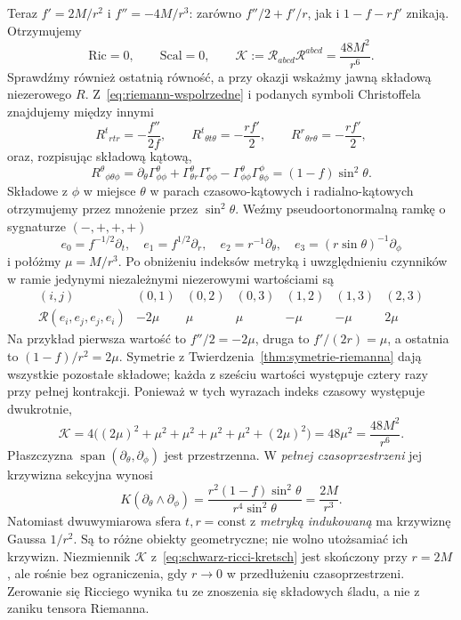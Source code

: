 \begin{przyklad}
Teraz $f'=2M/r^2$ i $f''=-4M/r^3$:
zarówno $f''/2+f'/r$, jak i $1-f-rf'$ znikają.
Otrzymujemy
\begin{equation}\label{eq:schwarz-ricci-kretsch}
 \mathrm{Ric}=0,\qquad \mathrm{Scal}=0,
 \qquad \mathcal K:={\mathcal R}_{abcd}
                   {\mathcal R}^{abcd}=\frac{48M^2}{r^6}.
\end{equation}
Sprawdźmy również ostatnią równość, a przy okazji
wskażmy jawną składową niezerowego $R$.
Z~\eqref{eq:riemann-wspolrzedne} i podanych symboli
Christoffela znajdujemy między innymi
\[
 R^t{}_{rtr}=-\frac{f''}{2f},\qquad
 R^t{}_{\theta t\theta}=-\frac{rf'}2,\qquad
 R^r{}_{\theta r\theta}=-\frac{rf'}2,
\]
oraz, rozpisując składową kątową,
\[
 R^\theta{}_{\phi\theta\phi}
 =\partial_\theta\Gamma^\theta_{\phi\phi}
   +\Gamma^\theta_{\theta r}\Gamma^r_{\phi\phi}
   -\Gamma^\theta_{\phi\phi}
          \Gamma^\phi_{\theta\phi}
 =(1-f)\sin^2\theta.
\]
Składowe z $\phi$ w miejsce $\theta$ w parach
czasowo-kątowych i radialno-kątowych otrzymujemy
przez mnożenie przez $\sin^2\theta$. Weźmy
pseudoortonormalną ramkę o sygnaturze $(-,+,+,+)$
\[
 e_0=f^{-1/2}\partial_t,\quad
 e_1=f^{1/2}\partial_r,\quad
 e_2=r^{-1}\partial_\theta,\quad
 e_3=(r\sin\theta)^{-1}\partial_\phi
\]
i połóżmy $\mu=M/r^3$. Po obniżeniu indeksów
metryką i uwzględnieniu czynników w ramie
jedynymi niezależnymi niezerowymi wartościami są
\[
 \begin{array}{c|rrrrrr}
 (i,j)&(0,1)&(0,2)&(0,3)&(1,2)&(1,3)&(2,3)\\ \hline
 \mathcal R(e_i,e_j,e_j,e_i)
       &-2\mu&\mu&\mu&-\mu&-\mu&2\mu
 \end{array}
\]
Na przykład pierwsza wartość to $f''/2=-2\mu$,
druga to $f'/(2r)=\mu$, a ostatnia to
$(1-f)/r^2=2\mu$. Symetrie z
Twierdzenia~\ref{thm:symetrie-riemanna} dają
wszystkie pozostałe składowe; każda z sześciu
wartości występuje cztery razy przy pełnej
kontrakcji. Ponieważ w tych wyrazach indeks
czasowy występuje dwukrotnie,
\[
 \mathcal K=4\bigl((2\mu)^2+\mu^2+\mu^2
                     +\mu^2+\mu^2+(2\mu)^2\bigr)
           =48\mu^2=\frac{48M^2}{r^6}.
\]
Płaszczyzna $\operatorname{span}(\partial_\theta,
\partial_\phi)$ jest przestrzenna. W \emph{pełnej
czasoprzestrzeni} jej krzywizna sekcyjna wynosi
\begin{equation}\label{eq:schwarz-k-sekcyjna-katowa}
 K(\partial_\theta\wedge\partial_\phi)
 =\frac{r^2(1-f)\sin^2\theta}{r^4\sin^2\theta}
 =\frac{2M}{r^3}.
\end{equation}
Natomiast dwuwymiarowa sfera $t,r=\mathrm{const}$
z \emph{metryką indukowaną} ma krzywiznę Gaussa
$1/r^2$. Są to różne obiekty geometryczne;
nie wolno utożsamiać ich krzywizn. Niezmiennik
$\mathcal K$ z~\eqref{eq:schwarz-ricci-kretsch}
jest skończony przy $r=2M$, ale rośnie bez
ograniczenia, gdy $r\to0$ w przedłużeniu
czasoprzestrzeni. Zerowanie się Ricciego wynika
tu ze znoszenia się składowych śladu, a nie z
zaniku tensora Riemanna.
\end{przyklad}

